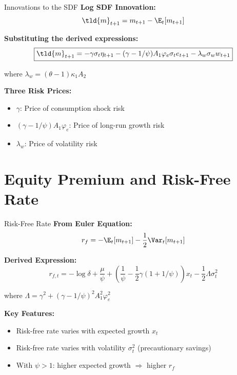 \documentclass{beamer}
\begin{document}
\begin{frame}{Innovations to the SDF}
    \textbf{Log SDF Innovation:}
    \begin{equation}
        \tld{m}_{t+1} = m_{t+1} - \E_t[m_{t+1}]
    \end{equation}
    
    \textbf{Substituting the derived expressions:}
    \begin{equation}
        \boxed{\tld{m}_{t+1} = -\gamma \sigma_t \eta_{t+1} - (\gamma - 1/\psi) A_1 \varphi_e \sigma_t e_{t+1} - \lambda_w \sigma_w w_{t+1}}
    \end{equation}
    
    where $\lambda_w = (\theta - 1) \kappa_1 A_2$
    
    \vspace{0.3cm}
    \textbf{Three Risk Prices:}
    \begin{itemize}
        \item $\gamma$: Price of consumption shock risk
        \item $(\gamma - 1/\psi) A_1 \varphi_e$: Price of long-run growth risk
        \item $\lambda_w$: Price of volatility risk
    \end{itemize}
\end{frame}

\section{Equity Premium and Risk-Free Rate}

\begin{frame}{Risk-Free Rate}
    \textbf{From Euler Equation:}
    \begin{equation}
        r_f = -\E_t[m_{t+1}] - \frac{1}{2}\Var_t[m_{t+1}]
    \end{equation}
    
    \textbf{Derived Expression:}
    \begin{equation}
        \boxed{r_{f,t} = -\log\delta + \frac{\mu}{\psi} + \left(\frac{1}{\psi} - \frac{1}{2}\gamma(1+1/\psi)\right)x_t - \frac{1}{2}\Lambda \sigma_t^2}
    \end{equation}
    
    where $\Lambda = \gamma^2 + (\gamma - 1/\psi)^2 A_1^2 \varphi_e^2$
    
    \vspace{0.3cm}
    \textbf{Key Features:}
    \begin{itemize}
        \item Risk-free rate varies with expected growth $x_t$
        \item Risk-free rate varies with volatility $\sigma_t^2$ (precautionary savings)
        \item With $\psi > 1$: higher expected growth $\Rightarrow$ higher $r_f$
    \end{itemize}
\end{frame}
\end{document}
